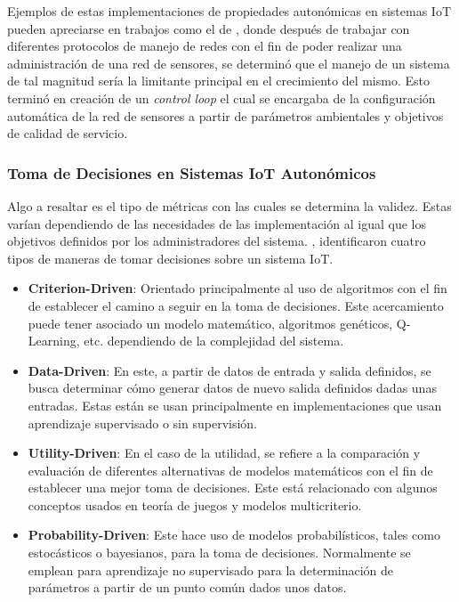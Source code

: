 Ejemplos de estas implementaciones de propiedades autonómicas en sistemas IoT pueden apreciarse en trabajos como el de \citeauthor{Rajan2011} \citeyear{Rajan2011}, donde después de trabajar con diferentes protocolos de manejo de redes con el fin de poder realizar una administración de una red de sensores, se determinó que el manejo de un sistema de tal magnitud sería la limitante principal en el crecimiento del mismo. Esto terminó en creación de un \textit{control loop} el cual se encargaba de la configuración automática de la red de sensores a partir de parámetros ambientales y objetivos de calidad de servicio.

\subsubsection{Toma de Decisiones en Sistemas IoT Autonómicos}

Algo a resaltar es el tipo de métricas con las cuales se determina la validez. Estas varían dependiendo de las necesidades de las implementación al igual que los objetivos definidos por los administradores del sistema. , identificaron cuatro tipos de maneras de tomar decisiones sobre un sistema IoT.

\begin{itemize}
    \item \textbf{Criterion-Driven}: Orientado principalmente al uso de algoritmos con el fin de establecer el camino a seguir en la toma de decisiones. Este acercamiento puede tener asociado un modelo matemático, algoritmos genéticos, Q-Learning, etc. dependiendo de la complejidad del sistema.
    \item \textbf{Data-Driven}: En este, a partir de datos de entrada y salida definidos, se busca determinar cómo generar datos de nuevo salida definidos dadas unas entradas. Estas están se usan principalmente en implementaciones que usan aprendizaje supervisado o sin supervisión. 
    \item \textbf{Utility-Driven}: En el caso de la utilidad, se refiere a la comparación y evaluación de diferentes alternativas de modelos matemáticos con el fin de establecer una mejor toma de decisiones. Este está relacionado con algunos conceptos usados en teoría de juegos y modelos multicriterio.
    \item \textbf{Probability-Driven}: Este hace uso de modelos probabilísticos, tales como estocásticos o bayesianos, para la toma de decisiones. Normalmente se emplean para aprendizaje no supervisado para la determinación de parámetros a partir de un punto común dados unos datos.
\end{itemize}
